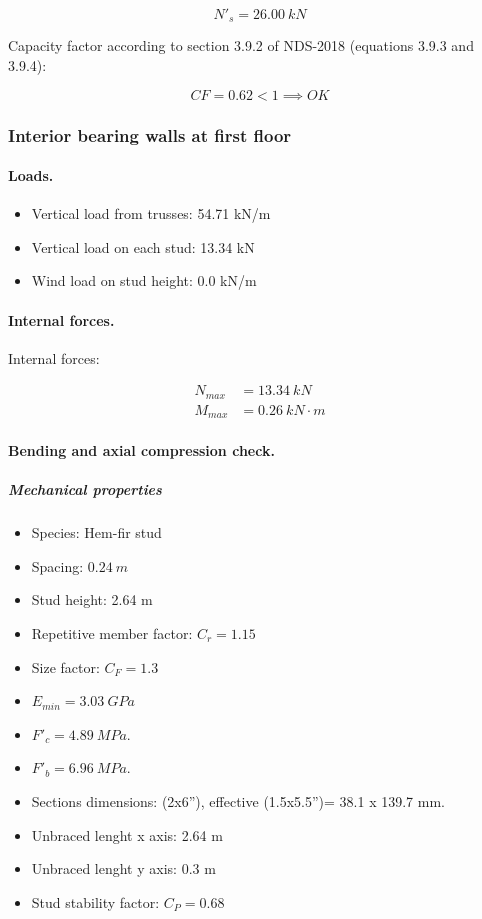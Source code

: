 \begin{equation}
  N'_s= 26.00\ kN
\end{equation}

\noindent Capacity factor according to section 3.9.2 of NDS-2018 (equations 3.9.3 and 3.9.4):

\begin{equation}
  CF= 0.62 < 1 \implies OK
\end{equation}

\subsubsection{Interior bearing walls at first floor}

\paragraph{Loads.}

\begin{itemize}
\item Vertical load from trusses: 54.71 kN/m
\item Vertical load on each stud: 13.34 kN
\item Wind load on stud height: 0.0 kN/m
\end{itemize}

\paragraph{Internal forces.}

\noindent Internal forces:

\begin{align}
  N_{max}&= 13.34\ kN \\
  M_{max}&= 0.26\ kN \cdot m
\end{align}

\paragraph{Bending and axial compression check.}

\subparagraph{Mechanical properties}

\begin{itemize}
\item Species: Hem-fir stud
\item Spacing: $0.24\ m$
\item Stud height: 2.64 m
\item Repetitive member factor: $C_r= 1.15$
\item Size factor: $C_F= 1.3$
\item $E_{min}= 3.03\ GPa$
\item $F'_c= 4.89\ MPa$.
\item $F'_b= 6.96\ MPa$.
\item Sections dimensions: (2x6''), effective (1.5x5.5'')= 38.1 x 139.7  mm.
\item Unbraced lenght x axis: 2.64 m
\item Unbraced lenght y axis: 0.3 m
\item Stud stability factor: $C_P= 0.68$
\end{itemize}

